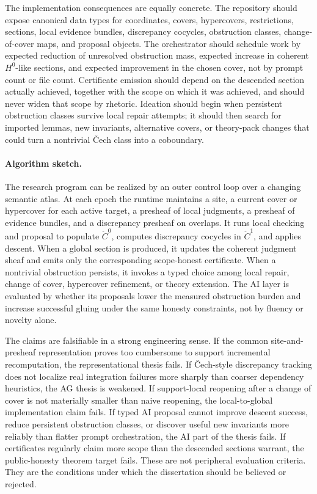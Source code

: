 \documentclass[11pt]{report}
\begin{document}
The implementation consequences are equally concrete. The repository should expose canonical data types for coordinates, covers, hypercovers, restrictions, sections, local evidence bundles, discrepancy cocycles, obstruction classes, change-of-cover maps, and proposal objects. The orchestrator should schedule work by expected reduction of unresolved obstruction mass, expected increase in coherent $H^{0}$-like sections, and expected improvement in the chosen cover, not by prompt count or file count. Certificate emission should depend on the descended section actually achieved, together with the scope on which it was achieved, and should never widen that scope by rhetoric. Ideation should begin when persistent obstruction classes survive local repair attempts; it should then search for imported lemmas, new invariants, alternative covers, or theory-pack changes that could turn a nontrivial \v{C}ech class into a coboundary.

\paragraph{Algorithm sketch.}
The research program can be realized by an outer control loop over a changing semantic atlas. At each epoch the runtime maintains a site, a current cover or hypercover for each active target, a presheaf of local judgments, a presheaf of evidence bundles, and a discrepancy presheaf on overlaps. It runs local checking and proposal to populate $\check{C}^{0}$, computes discrepancy cocycles in $\check{C}^{1}$, and applies descent. When a global section is produced, it updates the coherent judgment sheaf and emits only the corresponding scope-honest certificate. When a nontrivial obstruction persists, it invokes a typed choice among local repair, change of cover, hypercover refinement, or theory extension. The AI layer is evaluated by whether its proposals lower the measured obstruction burden and increase successful gluing under the same honesty constraints, not by fluency or novelty alone.

The claims are falsifiable in a strong engineering sense. If the common site-and-presheaf representation proves too cumbersome to support incremental recomputation, the representational thesis fails. If \v{C}ech-style discrepancy tracking does not localize real integration failures more sharply than coarser dependency heuristics, the AG thesis is weakened. If support-local reopening after a change of cover is not materially smaller than naive reopening, the local-to-global implementation claim fails. If typed AI proposal cannot improve descent success, reduce persistent obstruction classes, or discover useful new invariants more reliably than flatter prompt orchestration, the AI part of the thesis fails. If certificates regularly claim more scope than the descended sections warrant, the public-honesty theorem target fails. These are not peripheral evaluation criteria. They are the conditions under which the dissertation should be believed or rejected.
\end{document}
